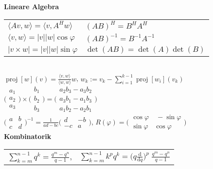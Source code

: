 \documentclass[a4paper,10pt,fleqn,twoside,twocolumn,dvipdfmx]{scrartcl}
\newcommand{\strong}[1]{\textsf{\textbf{#1}}}
\newcommand{\ds}{\displaystyle}
\begin{document}
\strong{Lineare Algebra}\\[2pt]
\begin{tabular}{@{}l|l}
$\langle Av,w\rangle = \langle v,A^H w\rangle$
& $(AB)^H = B^H A^H$\\
$\langle v,w\rangle = |v||w|\cos\varphi$
& $(AB)^{-1} = B^{-1} A^{-1}$\\
$|v\times w| = |v||w|\sin\varphi$
& $\det(AB) = \det(A)\det(B)$
\end{tabular}\\
$\operatorname{proj}[w](v) = \frac{\langle v,w\rangle}{\langle w,w\rangle} w$,\quad
$w_k := v_k - \sum_{i=1}^{k-1}\operatorname{proj}[w_i](v_k)$\\
$\bigg(\begin{smallmatrix}
a_{\scriptstyle 1}\\
a_{\scriptstyle 2}\\
a_{\scriptstyle 3}\end{smallmatrix}\bigg)\times
\bigg(\begin{smallmatrix}
b_{\scriptstyle 1}\\
b_{\scriptstyle 2}\\
b_{\scriptstyle 3}\end{smallmatrix}\bigg)
= \bigg(\begin{smallmatrix}
a_{\scriptstyle 2} b_{\scriptstyle 3} - a_{\scriptstyle 3} b_{\scriptstyle 2}\\
a_{\scriptstyle 3} b_{\scriptstyle 1} - a_{\scriptstyle 1} b_{\scriptstyle 3}\\
a_{\scriptstyle 1} b_{\scriptstyle 2} - a_{\scriptstyle 2} b_{\scriptstyle 1}
\end{smallmatrix}\bigg)$\\[4pt]
$\ds\big(\begin{smallmatrix}a & b\\ c & d\end{smallmatrix}\big)^{-1}
= \tfrac{1}{ad-bc}\big(\begin{smallmatrix}d & -b\\ -c & a\end{smallmatrix}\big)$,\;\;
$R(\varphi) = \big(\begin{smallmatrix}
\cos\varphi & \;-\sin\varphi\\
\sin\varphi & \cos\varphi
\end{smallmatrix}\big)$\\[4pt]
\strong{Kombinatorik}\\
\begin{tabular}{@{}ll}
$\ds{\textstyle\sum\limits_{k=m}^{n-1}} q^k = \frac{q^m-q^n}{q-1}$,
& $\ds{\textstyle\sum\limits_{k=m}^{n-1}} k^p q^k
= \Big(q\frac{\mathrm d}{\mathrm dq}\Big)^p\;\frac{q^m-q^n}{q-1}$
\end{tabular}\\
\end{document}
